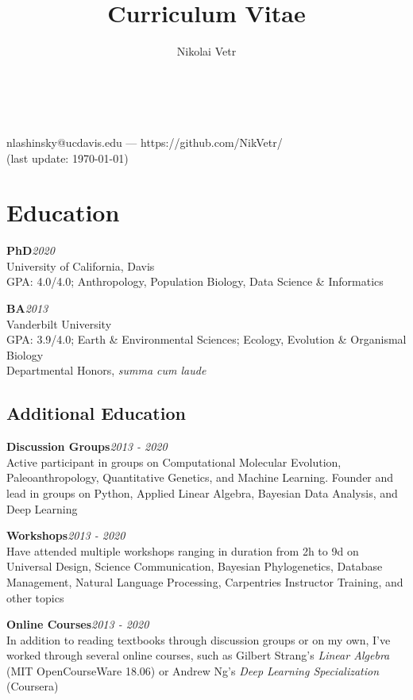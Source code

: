 \documentclass[12pt]{article}
\makeatletter
\newcommand{\cvcolor}{\color{DarkRed}} %
\renewcommand{\maketitle}{
\begin{center}

{\Huge\theauthor}\\
\vspace{0.25em}
{\Large \cvcolor{University of California, Davis}}\\

nlashinsky@ucdavis.edu --- https://github.com/NikVetr/\\

{\color{Gray}(last update: \today)}
\end{center}
}
\makeatother
\begin{document}
\title{Curriculum Vitae} %
\author{Nikolai Vetr}

\maketitle

\vspace{-1.5em}

\section{Education}

\textbf{PhD}\hfill\emph{2020}\\
University of California, Davis\\
GPA: 4.0/4.0; Anthropology, Population Biology, Data Science \& Informatics

\textbf{BA}\hfill\emph{2013}\\
Vanderbilt University\\
GPA: 3.9/4.0; Earth \& Environmental Sciences; Ecology, Evolution \& Organismal Biology\\
Departmental Honors, \textit{summa cum laude}\\
\vspace{-1.25em}
\subsection{Additional Education}

\textbf{Discussion Groups}\hfill\emph{2013 - 2020}\\
Active participant in groups on Computational Molecular Evolution, Paleoanthropology, Quantitative Genetics, and Machine Learning. Founder and lead in groups on Python, Applied Linear Algebra, Bayesian Data Analysis, and Deep Learning

\textbf{Workshops}\hfill\emph{2013 - 2020}\\
Have attended multiple workshops ranging in duration from 2h to 9d on Universal Design, Science Communication, Bayesian Phylogenetics, Database Management, Natural Language Processing, Carpentries Instructor Training, and other topics

\textbf{Online Courses}\hfill\emph{2013 - 2020}\\
In addition to reading textbooks through discussion groups or on my own, I've worked through several online courses, such as Gilbert Strang's \emph{Linear Algebra} (MIT OpenCourseWare 18.06) or Andrew Ng's \emph{Deep Learning Specialization} (Coursera)
\end{document}
